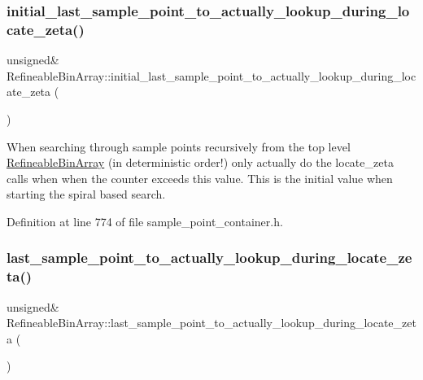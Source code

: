 \subsubsection{\texorpdfstring{initial\+\_\+last\+\_\+sample\+\_\+point\+\_\+to\+\_\+actually\+\_\+lookup\+\_\+during\+\_\+locate\+\_\+zeta()}{initial\_last\_sample\_point\_to\_actually\_lookup\_during\_locate\_zeta()}}
{\footnotesize\ttfamily unsigned\& Refineable\+Bin\+Array\+::initial\+\_\+last\+\_\+sample\+\_\+point\+\_\+to\+\_\+actually\+\_\+lookup\+\_\+during\+\_\+locate\+\_\+zeta (\begin{DoxyParamCaption}{ }\end{DoxyParamCaption})\hspace{0.3cm}{\ttfamily [inline]}}



When searching through sample points recursively from the top level \hyperlink{classRefineableBinArray}{Refineable\+Bin\+Array} (in deterministic order!) only actually do the locate\+\_\+zeta calls when when the counter exceeds this value. This is the initial value when starting the spiral based search. 



Definition at line 774 of file sample\+\_\+point\+\_\+container.\+h.

\mbox{\label{classRefineableBinArray_ad8dd347e3f9cd98555ebc96f9c968807}} 
\subsubsection{\texorpdfstring{last\+\_\+sample\+\_\+point\+\_\+to\+\_\+actually\+\_\+lookup\+\_\+during\+\_\+locate\+\_\+zeta()}{last\_sample\_point\_to\_actually\_lookup\_during\_locate\_zeta()}}
{\footnotesize\ttfamily unsigned\& Refineable\+Bin\+Array\+::last\+\_\+sample\+\_\+point\+\_\+to\+\_\+actually\+\_\+lookup\+\_\+during\+\_\+locate\+\_\+zeta (\begin{DoxyParamCaption}{ }\end{DoxyParamCaption})\hspace{0.3cm}{\ttfamily [inline]}}



